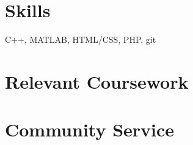\documentclass{resume}
\begin{document}
    \section{Skills}
    C++, MATLAB, HTML/CSS, PHP, git

    \section{Relevant Coursework}

    \section{Community Service}
\end{document}
